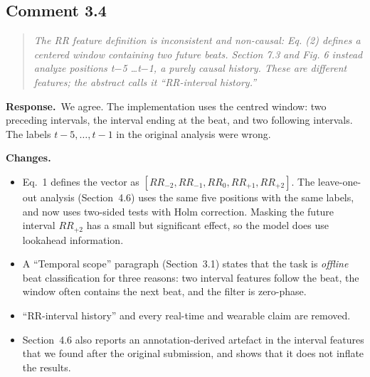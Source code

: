 \documentclass[11pt]{article}
\newenvironment{reviewer}{\begin{quote}\itshape\color{revcol}}{\end{quote}}
\newcommand{\resp}{\textbf{Response.}~}
\newcommand{\chg}{\textbf{Changes.}~}
\begin{document}
\subsection*{Comment 3.4}
\begin{reviewer}
The RR feature definition is inconsistent and non-causal: Eq. (2) defines a centered window containing two future beats. Section 7.3 and Fig. 6 instead analyze positions t$-$5 \ldots t$-$1, a purely causal history. These are different features; the abstract calls it ``RR-interval history.''
\end{reviewer}
\resp We agree. The implementation uses the centred window: two preceding intervals, the interval ending at the beat, and two following intervals. The labels $t-5,\ldots,t-1$ in the original analysis were wrong.

\chg
\begin{itemize}[leftmargin=1.2em,itemsep=2pt]
\item Eq.~1 defines the vector as $[RR_{-2},RR_{-1},RR_0,RR_{+1},RR_{+2}]$. The leave-one-out analysis (Section~4.6) uses the same five positions with the same labels, and now uses two-sided tests with Holm correction. Masking the future interval $RR_{+2}$ has a small but significant effect, so the model does use lookahead information.
\item A ``Temporal scope'' paragraph (Section~3.1) states that the task is \emph{offline} beat classification for three reasons: two interval features follow the beat, the window often contains the next beat, and the filter is zero-phase.
\item ``RR-interval history'' and every real-time and wearable claim are removed.
\item Section~4.6 also reports an annotation-derived artefact in the interval features that we found after the original submission, and shows that it does not inflate the results.
\end{itemize}
\end{document}
